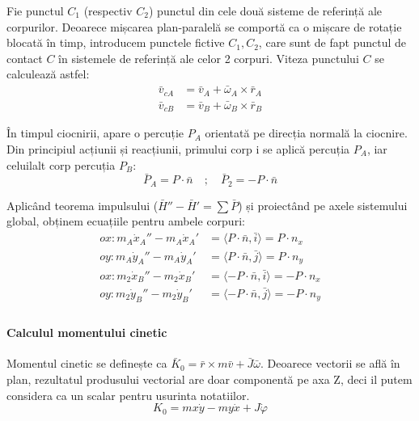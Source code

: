 \documentclass[12pt, a4paper]{article}
\begin{document}
Fie punctul $C_1$ (respectiv $C_2$) punctul din cele două sisteme de referință ale corpurilor. Deoarece mișcarea plan-paralelă se comportă ca o mișcare de rotație blocată în timp, introducem punctele fictive $C_1, C_2$, care sunt de fapt punctul de contact $C$ în sistemele de referință ale celor 2 corpuri. Viteza punctului $C$ se calculează astfel:
\begin{align}
    \bar{v}_{cA} &= \bar{v}_A + \bar{\omega}_A \times \bar{r}_{A} \\
    \bar{v}_{cB} &= \bar{v}_B + \bar{\omega}_B \times \bar{r}_{B} 
\end{align}

În timpul ciocnirii, apare o percuție $P_A$ orientată pe direcția normală la ciocnire. Din principiul acțiunii și reacțiunii, primului corp i se aplică percuția $P_A$, iar celuilalt corp percuția $P_B$:
\begin{equation}
    \bar{P}_A = P \cdot \bar{n} \quad ; \quad \bar{P}_2 = -P \cdot \bar{n} 
\end{equation}

Aplicând teorema impulsului ($\bar{H}'' - \bar{H}' = \sum \bar{P}$)  și proiectând pe axele sistemului global, obținem ecuațiile pentru ambele corpuri:
\begin{align}
    ox: m_A \dot{x}_A'' - m_A \dot{x}_A' &= \langle P \cdot \bar{n}, \bar{i} \rangle = P \cdot n_x \\
    oy: m_A \dot{y}_A'' - m_A \dot{y}_A' &= \langle P \cdot \bar{n}, \bar{j} \rangle = P \cdot n_y \\
    ox: m_2 \dot{x}_B'' - m_2 \dot{x}_B' &= \langle -P \cdot \bar{n}, \bar{i} \rangle = -P \cdot n_x \\
    oy: m_2 \dot{y}_B'' - m_2 \dot{y}_B' &= \langle -P \cdot \bar{n}, \bar{j} \rangle = -P \cdot n_y \\
\end{align}

\paragraph{Calculul momentului cinetic}
Momentul cinetic se definește ca $\bar{K}_0 = \bar{r} \times m\bar{v} + \bar{J}\bar{\omega}$. Deoarece vectorii se află în plan, rezultatul produsului vectorial are doar componentă pe axa Z, deci il putem considera ca un scalar pentru usurinta notatiilor.
\begin{equation}
    K_0 = m x \dot{y} - m y \dot{x} + J \dot{\varphi} 
\end{equation}
\end{document}
